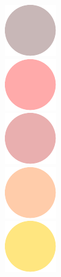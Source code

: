 \documentclass[xetex]{beamer}
\begin{document}
\begin{frame}
	\vspace{3em}
	\hspace{20em}\includegraphics[scale=0.6]{grafikk/dummy/circ1.pdf}\\ [-2em] 
	\hspace{25em}\includegraphics[scale=0.3]{grafikk/dummy/circ2.pdf}\\ [-5em]
	\hspace{30em}\includegraphics[scale=0.5]{grafikk/dummy/circ3.pdf}\\ [-6em]
	\hspace{35em}\includegraphics[scale=0.7]{grafikk/dummy/circ4.pdf}\\ [-3em]
	\hspace{40em}\includegraphics[scale=0.4]{grafikk/dummy/circ5.pdf}
\end{frame}
\end{document}
